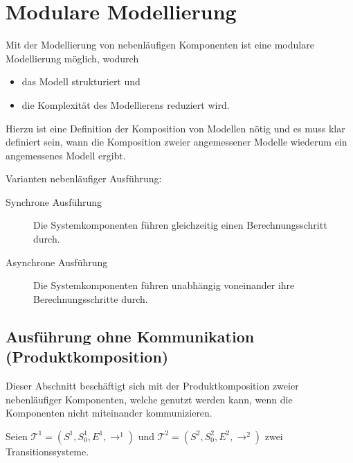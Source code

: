 													\section{Modulare Modellierung}
														Mit der Modellierung von nebenläufigen Komponenten ist eine modulare Modellierung möglich, wodurch
														\begin{itemize}
															\item das Modell strukturiert und
															\item die Komplexität des Modellierens reduziert wird.
														\end{itemize}
														Hierzu ist eine Definition der Komposition von Modellen nötig und es muss klar definiert sein, wann die Komposition zweier angemessener Modelle wiederum ein angemessenes Modell ergibt.

														Varianten nebenläufiger Ausführung:
														\begin{description}
															\item[Synchrone Ausführung] Die Systemkomponenten führen gleichzeitig einen Berechnungsschritt durch.
															\item[Asynchrone Ausführung] Die Systemkomponenten führen unabhängig voneinander ihre Berechnungsschritte durch.
														\end{description}

														\subsection{Ausführung ohne Kommunikation (Produktkomposition)}
															Dieser Abschnitt beschäftigt sich mit der Produktkomposition zweier nebenläufiger Komponenten, welche genutzt werden kann, wenn die Komponenten nicht miteinander kommunizieren.

															Seien $ \mathcal{T} ^ 1 = (S ^ 1, S _ 0 ^ 1, E ^ 1, \rightarrow ^ 1) $ und $ \mathcal{T} ^ 2 = (S ^ 2, S _ 0 ^ 2, E ^ 2, \rightarrow ^ 2) $ zwei Transitionssysteme.

